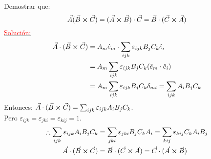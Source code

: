 \documentclass[../main]{subfiles}
\begin{document}
\begin{problema}{Demostrar que:}
    $$\vec{A}(\vec{B}\cross \vec{C})=(\vec{A}\cross \vec{B})\cdot \vec{C}=\vec{B}\cdot (\vec{C}\cross \vec{A})$$
    \underline{\textcolor{red}{Solución:}} \\
    \begin{align*}
        \vec{A}\cdot(\vec{B}\cross \vec{C})&=A_m \hat{e}_m \cdot \sum_{ijk}\varepsilon_{ijk}B_j C_k \hat{e}_i \\
        &=A_m \sum_{ijk} \varepsilon_{ijk}B_j C_k(\hat{e}_m \cdot \hat{e}_i)\\
        &=A_m \sum_{ijk} \varepsilon_{ijk}B_j C_k \delta_{mi}=\sum_{ijk} A_i B_j C_k
    \end{align*}
    Entonces: $\vec{A}\cdot (\vec{B}\cross \vec{C})=\sum_{ijk}\varepsilon_{ijk}A_i B_j C_k$. \\
    Pero $\varepsilon_{ijk}=\varepsilon_{jki}=\varepsilon_{kij}=1$.
    \begin{align*}
        \therefore \sum_{ijk}\varepsilon_{ijk}A_i B_j C_k &=\sum_{jki}\varepsilon_{jki}B_j C_k A_i=\sum_{kij}\varepsilon_{kij} C_k A_i B_j \\
        \vec{A}\cdot(\vec{B}\cross \vec{C})&=\vec{B}\cdot(\vec{C}\cross \vec{A})=\vec{C}\cdot (\vec{A}\cross \vec{B})
    \end{align*}
\end{problema}
\end{document}
